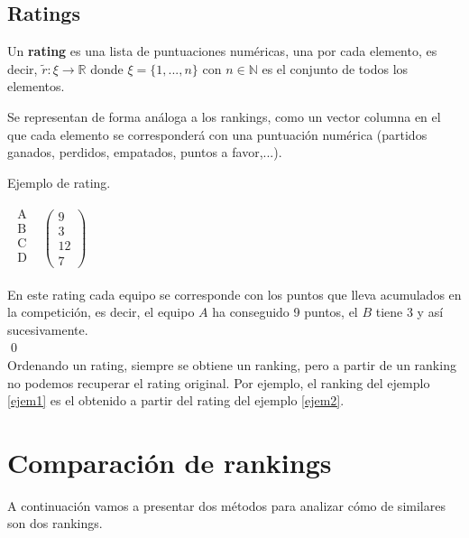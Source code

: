 \subsection*{Ratings}
\begin{defi} 
	Un \textbf{rating} es una lista de puntuaciones numéricas, una por cada elemento, es decir, $\tilde{r}: \xi \rightarrow \mathbb{R}$ donde $\xi = \{1,...,n\}$ con $n \in \mathbb{N}$ es el conjunto de todos los elementos.
\end{defi}

Se representan de forma análoga a los rankings, como un vector columna en el que cada elemento se corresponderá con una puntuación numérica (partidos ganados, perdidos, empatados, puntos a favor,...).

\begin{ejem} \label{ejem2}
Ejemplo de rating.
\end{ejem}
\begin{center}
$\begin{array}{ccc}
\begin{array}{c}
\text{A}\\
\text{B} \\
\text{C} \\
\text{D} \\
\end{array} & \left(\begin{array}{c}
9\\
3\\
12\\
7
\end{array} \right)
\end{array} $ 
\end{center}
En este rating cada equipo se corresponde con los puntos que lleva acumulados en la competición, es decir, el equipo $A$ ha conseguido 9 puntos, el $B$ tiene 3 y así sucesivamente. \\
\qed
\ \\

Ordenando un rating, siempre se obtiene un ranking, pero a partir de un ranking no podemos recuperar el rating original. Por ejemplo, el ranking del ejemplo \ref{ejem1} es el obtenido a partir del rating del ejemplo \ref{ejem2}.

\section{Comparación de rankings}
A continuación vamos a presentar dos métodos para analizar cómo de similares son dos rankings. 
